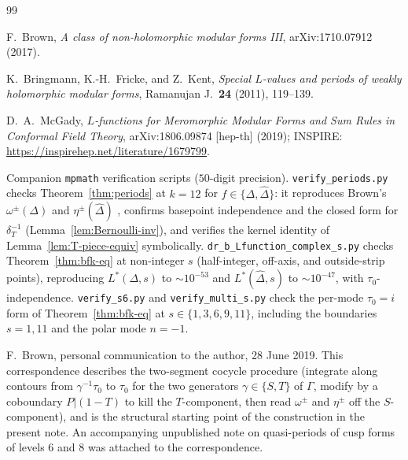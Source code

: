 \documentclass[11pt]{article}
\numberwithin{equation}{section}  %
\newcommand{\Dhat}{\widehat{\Delta}}
\begin{document}
\begin{thebibliography}{99}

F.\ Brown,
\emph{A class of non-holomorphic modular forms III},
arXiv:1710.07912 (2017).

K.\ Bringmann, K.-H.\ Fricke, and Z.\ Kent,
\emph{Special $L$-values and periods of weakly holomorphic modular forms},
Ramanujan J.\ \textbf{24} (2011), 119--139.

D.\ A.\ McGady,
\emph{$L$-functions for Meromorphic Modular Forms and Sum Rules in
Conformal Field Theory},
arXiv:1806.09874 [hep-th] (2019);
INSPIRE: \url{https://inspirehep.net/literature/1679799}.

Companion \texttt{mpmath} verification scripts ($50$-digit precision).
\texttt{verify\_periods.py} checks Theorem~\ref{thm:periods} at $k = 12$
for $f \in \{\Delta, \Dhat\}$: it reproduces Brown's
$\omega^\pm(\Delta)$ and $\eta^\pm(\Dhat)$ \cite{Brown2017}, confirms
basepoint independence and the closed form for $\delta_T^{-1}$
(Lemma~\ref{lem:Bernoulli-inv}), and verifies the kernel identity of
Lemma~\ref{lem:T-piece-equiv} symbolically.
\texttt{dr\_b\_Lfunction\_complex\_s.py} checks Theorem~\ref{thm:bfk-eq}
at non-integer $s$ (half-integer, off-axis, and outside-strip points),
reproducing $L^*(\Delta, s)$ to $\sim 10^{-53}$ and $L^*(\Dhat, s)$ to
$\sim 10^{-47}$, with $\tau_0$-independence.
\texttt{verify\_s6.py} and \texttt{verify\_multi\_s.py} check the
per-mode $\tau_0 = i$ form of Theorem~\ref{thm:bfk-eq} at
$s \in \{1, 3, 6, 9, 11\}$, including the boundaries $s = 1, 11$ and the
polar mode $n = -1$.

F.\ Brown, personal communication to the author, 28 June 2019.  This
correspondence describes the two-segment cocycle procedure (integrate
along contours from $\gamma^{-1}\tau_0$ to $\tau_0$ for the two
generators $\gamma \in \{S, T\}$ of $\Gamma$, modify by a coboundary
$P|(1 - T)$ to kill the $T$-component, then read $\omega^\pm$ and
$\eta^\pm$ off the $S$-component), and is the structural starting
point of the construction in the present note.  An accompanying
unpublished note on quasi-periods of cusp forms of levels $6$ and $8$
was attached to the correspondence.


\end{thebibliography}
\end{document}
